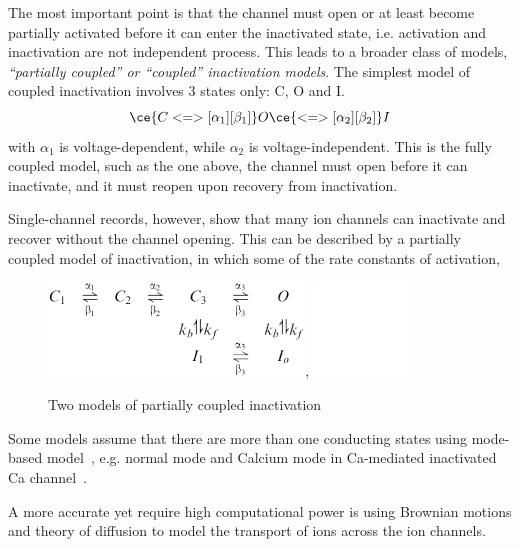 The most important point is that the channel must open or at least become
partially activated before it can enter the inactivated state, i.e. activation
and inactivation are not independent process.  This leads to a broader class of
models, {\it ``partially coupled'' or ``coupled'' inactivation models}. The
simplest model of coupled inactivation involves 3 states only: C, O and I.
\begin{equation}
  \label{eq:80}
  \ce{C <=>[\alpha_1][\beta_1]} O \ce{<=>[\alpha_2][\beta_2]} I
\end{equation}
with $\alpha_1$ is voltage-dependent, while $\alpha_2$ is
voltage-independent.  This is the fully coupled model, such as the one
above, the channel must open before it can inactivate, and it must
reopen upon recovery from inactivation.

Single-channel records, however, show that many ion channels
can inactivate and recover without the channel opening. This can be described
by a partially coupled model of inactivation, in which some of the
rate constants of activation,

\begin{figure}[hbt]
  \centerline{\includegraphics[height=2.5cm,
    angle=0]{./images/partially_coupled_inactivation.eps}, \includegraphics[height=2.5cm,
    angle=0]{./images/partially_coupled_inactivation_2.eps}}
  \caption{Two models of partially coupled inactivation}
  \label{fig:partial_couple_inact}
\end{figure}

Some models assume that there are more than one conducting states
using mode-based model~\citep{sigworth1977sc2}, e.g. normal mode and
Calcium mode in Ca-mediated inactivated Ca
channel~\citep{jafri1998cad}.

A more accurate yet require high computational power is using Brownian
motions and theory of diffusion to model the transport of ions across
the ion channels.


